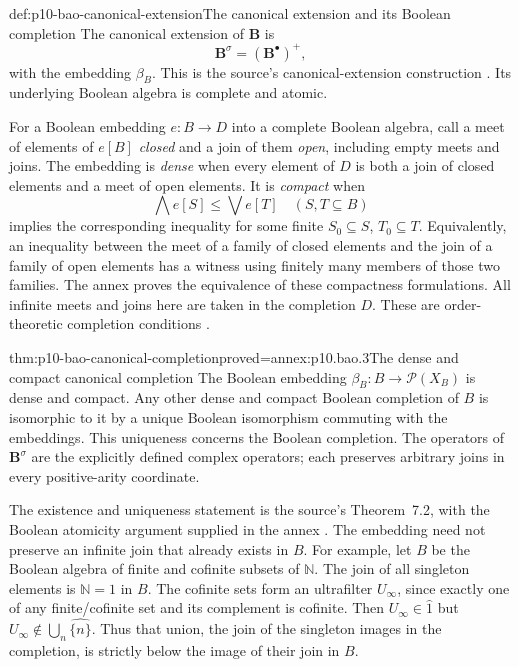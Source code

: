 \begin{hbdefinition}{def:p10-bao-canonical-extension}{The canonical extension and its Boolean completion}
The canonical extension of \(\mathbf B\) is
\[
 \mathbf B^\sigma=(\mathbf B^\bullet)^+,
\]
with the embedding \(\beta_B\).
This is the source's canonical-extension construction
\cite[preprint Definition~5.16, p.~21]{Venema2005Preprint}.
Its underlying Boolean algebra is complete and atomic.

For a Boolean embedding \(e:B\to D\) into a complete Boolean
algebra, call a meet of elements of \(e[B]\) \emph{closed} and a
join of them \emph{open}, including empty meets and joins.
The embedding is \emph{dense} when every element of \(D\) is
both a join of closed elements and a meet of open elements.
It is \emph{compact} when
\[
 \bigwedge e[S]\leq\bigvee e[T]\quad(S,T\subseteq B)
\]
implies the corresponding inequality for some finite
\(S_0\subseteq S\), \(T_0\subseteq T\).
Equivalently, an inequality between the meet of a family of
closed elements and the join of a family of open elements has
a witness using finitely many members of those two families.
The annex proves the equivalence of these compactness formulations.
All infinite meets and joins here are taken in the completion \(D\).
These are order-theoretic completion conditions
\cite[preprint \S7.2, Definition~7.1]{Venema2005Preprint}.
\end{hbdefinition}

\begin{hbtheorem}{thm:p10-bao-canonical-completion}{proved=annex:p10.bao.3}{The dense and compact canonical completion}
The Boolean embedding
\(\beta_B:B\to\mathcal P(X_B)\) is dense and compact.
Any other dense and compact Boolean completion of \(B\) is
isomorphic to it by a unique Boolean isomorphism commuting with
the embeddings.
This uniqueness concerns the Boolean completion.
The operators of \(\mathbf B^\sigma\) are the explicitly defined
complex operators; each preserves arbitrary joins in every
positive-arity coordinate.
\end{hbtheorem}

The existence and uniqueness statement is the source's
Theorem~7.2, with the Boolean atomicity argument supplied in
the annex \cite[preprint pp.~38--39]{Venema2005Preprint}.
The embedding need not preserve an infinite join that already
exists in \(B\).
For example, let \(B\) be the Boolean algebra of finite and
cofinite subsets of \(\mathbb N\).
The join of all singleton elements is \(\mathbb N=1\) in \(B\).
The cofinite sets form an ultrafilter \(U_\infty\), since exactly
one of any finite/cofinite set and its complement is cofinite.
Then \(U_\infty\in\widehat1\) but
\(U_\infty\notin\bigcup_n\widehat{\{n\}}\).
Thus that union, the join of the singleton images in the
completion, is strictly below the image of their join in \(B\).

